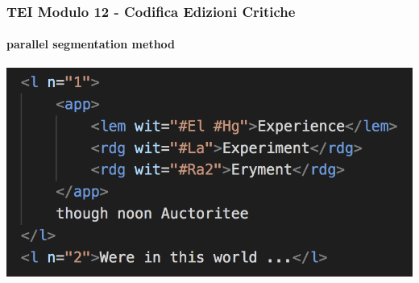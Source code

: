 \begin{frame}
    \frametitle{TEI Modulo 12 - Codifica Edizioni Critiche}
    \framesubtitle{parallel segmentation method}
    \addtocounter{nframe}{1}
    




   
    \begin{center}
       \includegraphics[width=.95\textwidth]{imgs/parallel-segmentation.png}
    \end{center}

\end{frame}




